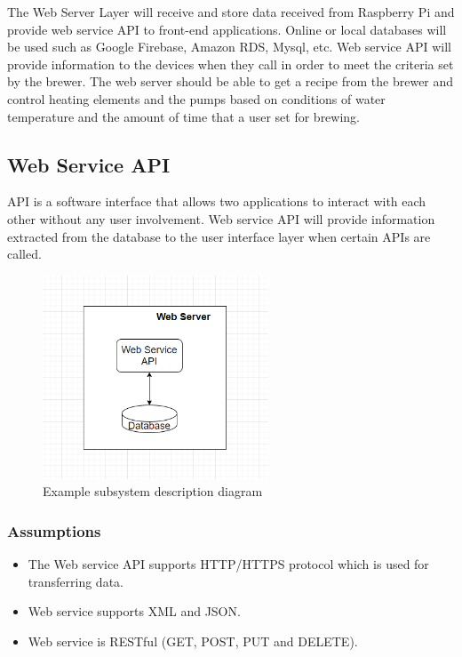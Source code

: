 The Web Server Layer will receive and store data received from Raspberry Pi and provide web service API to front-end applications. Online or local databases will be used such as Google Firebase, Amazon RDS, Mysql, etc. Web service API will provide information to the devices when they call in order to meet the criteria set by the brewer. The web server should be able to get a recipe from the brewer and control heating elements and the pumps based on conditions of water temperature and the amount of time that a user set for brewing.

\subsection{Web Service API}
API is a software interface that allows two applications to interact with each other without any user involvement. Web service API will provide information extracted from the database to the user interface layer when certain APIs are called.

\begin{figure}[h!]
	\centering
 	\includegraphics[width=0.60\textwidth]{images/web_layer.PNG}
 \caption{Example subsystem description diagram}
\end{figure}

\subsubsection{Assumptions}

\begin {itemize}
\item 
The Web service API supports HTTP/HTTPS protocol which is used for transferring data.
\item 
Web service supports XML and JSON.
\item 
Web service is RESTful (GET, POST, PUT and DELETE).
\end {itemize}


